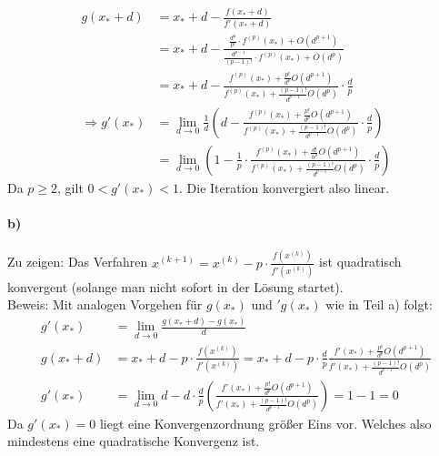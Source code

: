 \begin{align*}
g(x_*+d) &= x_*+d-\frac{f(x_*+d)}{f'(x_*+d)}\\
&= x_*+d-\frac{\frac{d^p}{p!}\cdot f^{(p)}(x_*) + O(d^{p+1})}{\frac{d^{p-1}}{(p-1)!}\cdot f^{(p)}(x_*) + O(d^{p})}\\
&= x_*+d-\frac{f^{(p)}(x_*) + \frac{p!}{d^p} O(d^{p+1})}{f^{(p)}(x_*) + \frac{(p-1)!}{d^{p-1}}O(d^{p})} \cdot \frac{d}{p}\\
\Rightarrow g'(x_*) &= \lim\limits_{d \rightarrow 0} \frac{1}{d}\left(d-\frac{f^{(p)}(x_*) + \frac{p!}{d^p} O(d^{p+1})}{f^{(p)}(x_*) + \frac{(p-1)!}{d^{p-1}}O(d^{p})} \cdot \frac{d}{p} \right)\\
&= \lim\limits_{d \rightarrow 0}\left(1- \frac{1}{p} \cdot \frac{f^{(p)}(x_*) + \frac{d!}{h^p} O(d^{p+1})}{f^{(p)}(x_*) + \frac{(p-1)!}{d^{p-1}}O(d^{p})} \cdot \frac{d}{p} \right)
\end{align*}
Da $p\ge2$, gilt $0<g'(x_*) < 1$. Die Iteration konvergiert also linear.

\paragraph*{b)}
Zu zeigen: Das Verfahren $x^{(k+1)}=x^{(k)} - p \cdot \frac{f(x^{(k)})}{f'(x^{(k)})}$ ist quadratisch konvergent (solange man nicht sofort in der Lösung startet).\\
Beweis: Mit analogen Vorgehen für $g(x_*)$ und $'g(x_*)$ wie in Teil a) folgt:
\begin{align*}
g'(x_*) &= \lim\limits_{d \rightarrow 0} \frac{g(x_*+d)-g(x_*)}{d}\\
g(x_*+d) &= x_* + d - p \cdot \frac{f(x^{(k)})}{f'(x^{(k)})} = x_*+d-p\cdot \frac{d}{p}\frac{f'(x_*) + \frac{p!}{d^p}O(d^{p+1})}{f'(x_*) + \frac{(p-1)!}{d^{p-1}}O(d^{p})}\\
g'(x_*) &= \lim\limits_{d \rightarrow 0} d-d \cdot \frac{d}{p}\left(\frac{f'(x_*) + \frac{p!}{d^p}O(d^{p+1})}{f'(x_*) + \frac{(p-1)!}{d^{p-1}}O(d^{p})} \right) = 1-1 = 0
\end{align*}
Da $g'(x_*) = 0$ liegt eine Konvergenzordnung größer Eins vor. Welches also mindestens eine quadratische Konvergenz ist.